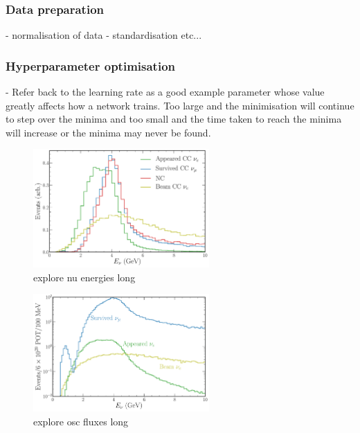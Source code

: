 \subsubsection*{Data preparation}

- normalisation of data
- standardisation etc...

\subsubsection*{Hyperparameter optimisation}

- Refer back to the learning rate as a good example
parameter whose value greatly affects how a network trains. Too large and the minimisation will
continue to step over the minima and too small and the time taken to reach the minima will
increase or the minima may never be found.



\begin{figure} %
    \includegraphics[width=0.6\textwidth]{diagrams/6-cvn/chipsnet/explore_nu_energies.pdf}
    \caption[explore nu energies short]
    {explore nu energies long}
    \label{fig:explore_nu_energies}
\end{figure}

\begin{figure} %
    \includegraphics[width=0.6\textwidth]{diagrams/6-cvn/chipsnet/explore_osc_fluxes.pdf}
    \caption[explore osc fluxes short]
    {explore osc fluxes long}
    \label{fig:explore_osc_fluxes}
\end{figure}

